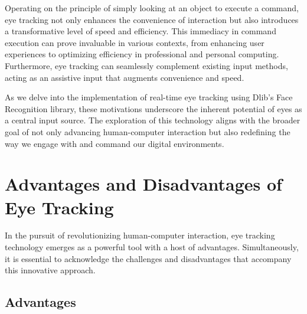 \documentclass[letterpaper, 10 pt, conference]{ieeeconf}  %
\begin{document}
Operating on the principle of simply looking at an object to execute a command, eye tracking not only enhances the convenience of interaction but also introduces a transformative level of speed and efficiency. This immediacy in command execution can prove invaluable in various contexts, from enhancing user experiences to optimizing efficiency in professional and personal computing. Furthermore, eye tracking can seamlessly complement existing input methods, acting as an assistive input that augments convenience and speed.

As we delve into the implementation of real-time eye tracking using Dlib's Face Recognition library, these motivations underscore the inherent potential of eyes as a central input source. The exploration of this technology aligns with the broader goal of not only advancing human-computer interaction but also redefining the way we engage with and command our digital environments.


\section{Advantages and Disadvantages of Eye Tracking}

In the pursuit of revolutionizing human-computer interaction, eye tracking technology emerges as a powerful tool with a host of advantages. Simultaneously, it is essential to acknowledge the challenges and disadvantages that accompany this innovative approach.

\subsection{Advantages}
\end{document}

